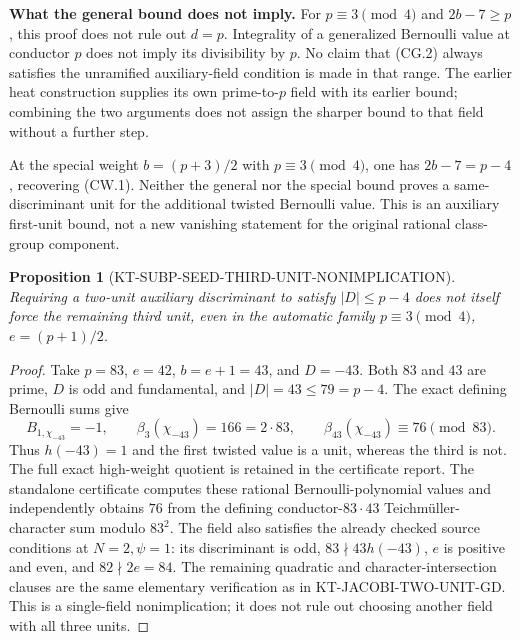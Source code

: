 \documentclass[11pt,a4paper]{article}
\newtheorem{proposition}[theorem]{Proposition}
\theoremstyle{definition}
\renewcommand{\paragraph}[1]{\par\smallskip\noindent\textbf{#1}\quad\ignorespaces}
\begin{document}
\paragraph{What the general bound does not imply.}
For $p\equiv3\pmod4$ and $2b-7\geq p$, this proof
does not rule out $d=p$.  Integrality of a generalized
Bernoulli value at conductor $p$ does not imply its
divisibility by $p$.  No claim that (CG.2) always satisfies
the unramified auxiliary-field condition is made in that
range.  The earlier heat construction supplies its own
prime-to-$p$ field with its earlier bound; combining the
two arguments does not assign the sharper bound to that
field without a further step.

At the special weight $b=(p+3)/2$ with $p\equiv3\pmod4$,
one has $2b-7=p-4$, recovering (CW.1).
Neither the general nor the special bound proves a
same-discriminant unit for the additional twisted
Bernoulli value.  This is an auxiliary first-unit bound,
not a new vanishing statement for the original rational
class-group component.



\begin{proposition}[KT-SUBP-SEED-THIRD-UNIT-NONIMPLICATION]
Requiring a two-unit auxiliary discriminant to satisfy $|D|\leq p-4$
does not itself force the remaining third unit, even in the automatic
family $p\equiv3\pmod4$, $e=(p+1)/2$.
\end{proposition}
\begin{proof}
Take $p=83$, $e=42$, $b=e+1=43$, and $D=-43$.  Both $83$ and $43$
are prime, $D$ is odd and fundamental, and $|D|=43\leq79=p-4$.
The exact defining Bernoulli sums give
\[
 B_{1,\chi_{-43}}=-1,\qquad
 \beta_3(\chi_{-43})=166=2\cdot83,
 \qquad \beta_{43}(\chi_{-43})\equiv76\pmod{83}.
\]
Thus $h(-43)=1$ and the first twisted value is a unit, whereas the
third is not.  The full exact high-weight quotient is retained in the
certificate report.
The standalone certificate
 computes these rational
Bernoulli-polynomial values and independently obtains $76$ from the
defining conductor-$83\cdot43$ Teichm\"uller-character sum modulo $83^2$.
The field also satisfies the already checked source conditions at
$N=2,\psi=1$: its discriminant is odd, $83\nmid43h(-43)$, $e$ is
positive and even, and $82\nmid2e=84$.  The remaining quadratic and
character-intersection clauses are the same elementary verification
as in KT-JACOBI-TWO-UNIT-GD.  This is a single-field nonimplication;
it does not rule out choosing another field with all three units.
\end{proof}
\end{document}
